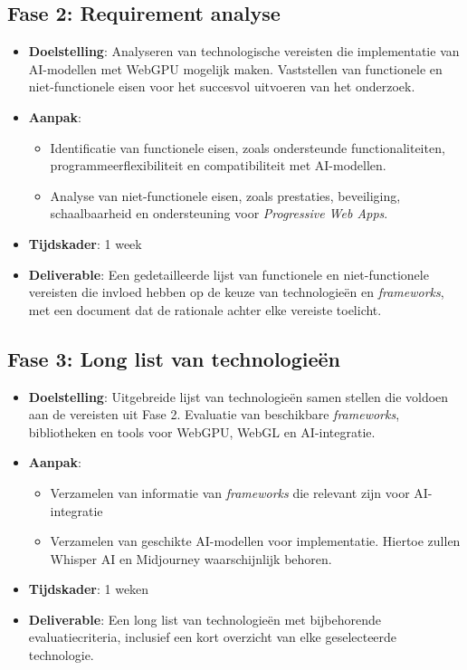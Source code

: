 \subsection*{Fase 2: Requirement analyse}

\begin{itemize}
  \item \textbf{Doelstelling}: Analyseren van technologische vereisten die implementatie van AI-modellen met WebGPU mogelijk maken. Vaststellen van functionele en niet-func\-tio\-ne\-le eisen voor het succesvol uitvoeren van het onderzoek.

  \item \textbf{Aanpak}:
  \begin{itemize}
    \item Identificatie van functionele eisen, zoals ondersteunde functionaliteiten, programmeerflexibiliteit en compatibiliteit met AI-modellen.
    \item Analyse van niet-functionele eisen, zoals prestaties, beveiliging, schaalbaarheid en ondersteuning voor \textit{Progressive Web Apps}.
  \end{itemize}

  \item \textbf{Tijdskader}: 1 week
  \item \textbf{Deliverable}: Een gedetailleerde lijst van functionele en niet-func\-tio\-ne\-le vereisten die invloed hebben op de keuze van technologieën en \textit{frameworks}, met een document dat de rationale achter elke vereiste toelicht.
\end{itemize}

\subsection*{Fase 3: Long list van technologieën}
\begin{itemize}
  \item \textbf{Doelstelling}: Uitgebreide lijst van technologieën samen stellen die voldoen aan de vereisten uit Fase 2. Evaluatie van beschikbare \textit{frameworks}, bibliotheken en tools voor WebGPU, WebGL en AI-integratie.
  
  \newpage

  \item \textbf{Aanpak}:
  \begin{itemize}
    \item Verzamelen van informatie van \textit{frameworks} die relevant zijn voor AI-integratie
    \item Verzamelen van geschikte AI-modellen voor implementatie. Hiertoe zullen Whisper AI en Midjourney waarschijnlijk behoren.
  \end{itemize}

  \item \textbf{Tijdskader}: 1 weken
  \item \textbf{Deliverable}: Een long list van technologieën met bijbehorende evaluatiecriteria, inclusief een kort overzicht van elke geselecteerde technologie.
\end{itemize}

